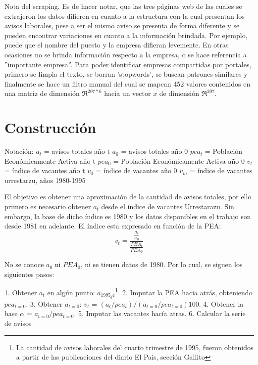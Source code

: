Nota del scraping. Es de hacer notar, que las tres páginas web de las cuales se extrajeron los datos difieren en cuanto a la estructura con la cual presentan los avisos laborales, pese a ser el mismo aviso se presenta de forma diferente y se pueden encontrar variaciones en cuanto a la información brindada. Por ejemplo, puede que el nombre del puesto y la empresa difieran levemente. En otras ocasiones no se brinda información respecto a la empresa, o se hace referencia a ''importante empresa''. Para poder identificar empresas compartidas por portales, primero se limpia el texto, se borran 'stopwords', se buscan patrones similares y finalmente se hace un filtro manual del cual se mapean 452 valores contenidos en una matriz de dimensión $\Re^{207*6}$ hacia un vector $x$ de dimensión $\Re^{207}$. 

\section{Construcción}

Notación: \newline
$a_t$ = avisos totales año t \newline
$a_0$ = avisos totales año 0 \newline
$pea_t$ = Población Económicamente Activa año t \newline
$pea_0$ = Población Económicamente Activa año 0 \newline
$v_t$ = índice de vacantes año t \newline
$v_0$ = índice de vacantes año 0 \newline
$v_m$ = índice de vacantes urrestarzu, años 1980-1995 \newline


El objetivo es obtener una aproximación de la cantidad de avisos totales, por ello primero es necesario obtener $a_t$ desde el índice de vacantes Urrestarazu. Sin embargo, la base de dicho índice es 1980 y los datos disponibles en el trabajo son desde 1981 en adelante. El índice esta expresado en función de la PEA:
\begin{equation}
v_t = \frac{\frac{a_t}{a_0}}{\frac{PEA_t}{PEA_0}}
\end{equation}

No se conoce $a_0$ ni $PEA_0$, ni se tienen datos de 1980. Por lo cual, se siguen los siguientes pasos:

1. Obtener $a_t$ en algún punto: $a_{1995_q4}$\footnote{La cantidad de avisos laborales del cuarto trimestre de 1995, fueron obtenidos a partir de las publicaciones del diario El País, sección Gallito}.
2. Imputar la PEA hacia atrás, obteniendo $pea_{t=0}$.
3. Obtener $a_{t=0}$:
$v_t$ = $(a_t/pea_t)/(a_{t=0}/pea_{t=0})100$.
4. Obtener la base $\alpha$ = $a_{t=0}$/$pea_{t=0}$.
5. Imputar las vacantes hacía atras.
6. Calcular la serie de avisos

